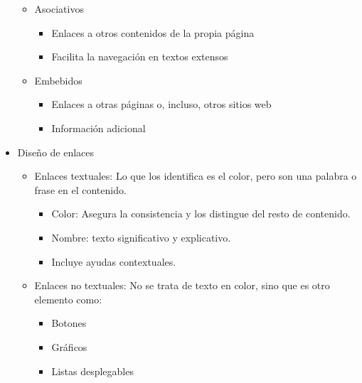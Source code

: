 \documentclass[12pt, twoside, openright]{report} %
\begin{document}
\begin{itemize}
\begin{itemize}
		      \item Asociativos

		            \begin{itemize}
			            \item Enlaces a otros contenidos de la propia página

			            \item Facilita la navegación en textos extensos
		            \end{itemize}

		      \item Embebidos

		            \begin{itemize}
			            \item Enlaces a otras páginas o, incluso, otros sitios web

			            \item Información adicional
		            \end{itemize}
	      \end{itemize}
	\item Diseño de enlaces

	      \begin{itemize}
		      \item Enlaces textuales: Lo que los identifica es el color, pero son
		            una palabra o frase en el contenido.

		            \begin{itemize}
			            \item Color: Asegura la consistencia y los distingue del resto de
			                  contenido.

			            \item Nombre: texto significativo y explicativo.

			            \item Incluye ayudas contextuales.
		            \end{itemize}

		      \item Enlaces no textuales: No se trata de texto en color, sino que
		            es otro elemento como:

		            \begin{itemize}
			            \item Botones

			            \item Gráficos

			            \item Listas desplegables


\end{itemize}
\end{itemize}
\end{itemize}
\end{document}

